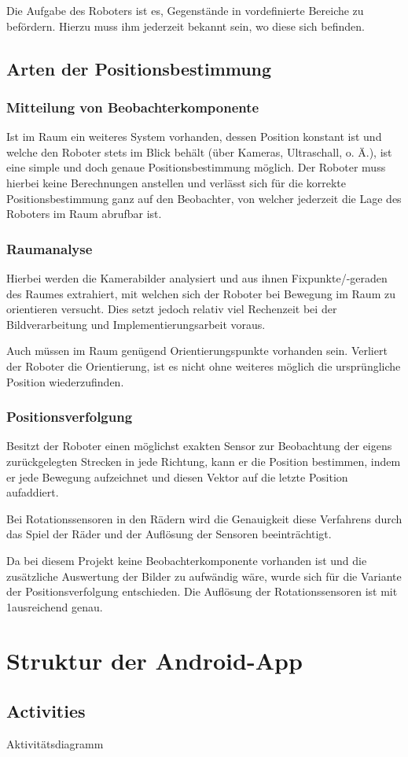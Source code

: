 Die Aufgabe des Roboters ist es, Gegenstände in vordefinierte Bereiche zu befördern. Hierzu muss ihm jederzeit bekannt sein, wo diese sich befinden.

\subsection{Arten der Positionsbestimmung}

\subsubsection{Mitteilung von Beobachterkomponente}
Ist im Raum ein weiteres System vorhanden, dessen Position konstant ist und welche den Roboter stets im Blick behält (über Kameras, Ultraschall, o. Ä.), ist eine simple und doch genaue Positionsbestimmung möglich. Der Roboter muss hierbei keine Berechnungen anstellen und verlässt sich für die korrekte Positionsbestimmung ganz auf den Beobachter, von welcher jederzeit die Lage des Roboters im Raum abrufbar ist.
\subsubsection{Raumanalyse}
Hierbei werden die Kamerabilder analysiert und aus ihnen Fixpunkte/-geraden des Raumes extrahiert, mit welchen sich der Roboter bei Bewegung im Raum zu orientieren versucht. Dies setzt jedoch relativ viel Rechenzeit bei der Bildverarbeitung und Implementierungsarbeit voraus.

Auch müssen im Raum genügend Orientierungspunkte vorhanden sein. Verliert der Roboter die Orientierung, ist es nicht ohne weiteres möglich die ursprüngliche Position wiederzufinden.
\subsubsection{Positionsverfolgung}
Besitzt der Roboter einen möglichst exakten Sensor zur Beobachtung der eigens zurückgelegten Strecken in jede Richtung, kann er die Position bestimmen, indem er jede Bewegung aufzeichnet und diesen Vektor auf die letzte Position aufaddiert.

Bei Rotationssensoren in den Rädern wird die Genauigkeit diese Verfahrens durch das Spiel der Räder und der Auflösung der Sensoren beeinträchtigt.

Da bei diesem Projekt keine Beobachterkomponente vorhanden ist und die zusätzliche Auswertung der Bilder zu aufwändig wäre, wurde sich für die Variante der Positionsverfolgung entschieden. Die Auflösung der Rotationssensoren ist mit 1\degree ausreichend genau.

\section{Struktur der Android-App}
\subsection{Activities}
Aktivitätsdiagramm






